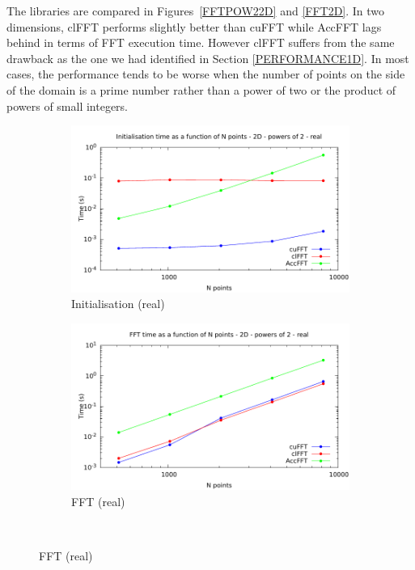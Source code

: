 \documentclass[12pt, a4paper]{article}
\begin{document}
The libraries are compared in Figures~\ref{FFTPOW22D} and \ref{FFT2D}.
In two dimensions, clFFT performs slightly better than cuFFT while
AccFFT lags behind in terms of FFT execution time. However clFFT suffers from the same drawback as
the one we had identified in Section \ref{PERFORMANCE1D}. In most
cases, the performance tends to be worse when
the number of points on the side of the domain is a prime number
rather than a power of two or the product of powers of small
integers.



\begin{figure}[htb]
\captionsetup{width=0.8\linewidth}
\centering
\begin{subfigure}{.5\textwidth}
\centering
\includegraphics[width=.9\linewidth]{graphs/fft-2d-pow2-r-init.pdf}
\caption{Initialisation (real)}
\label{FFTPOW22DRI}
\end{subfigure}%
\begin{subfigure}{.5\textwidth}
\centering
\includegraphics[width=.9\linewidth]{graphs/fft-2d-pow2-r-exec.pdf}
\caption{FFT (real)}
\label{FFTPOW22DRE}
\end{subfigure}\\

\end{figure}
\end{document}
